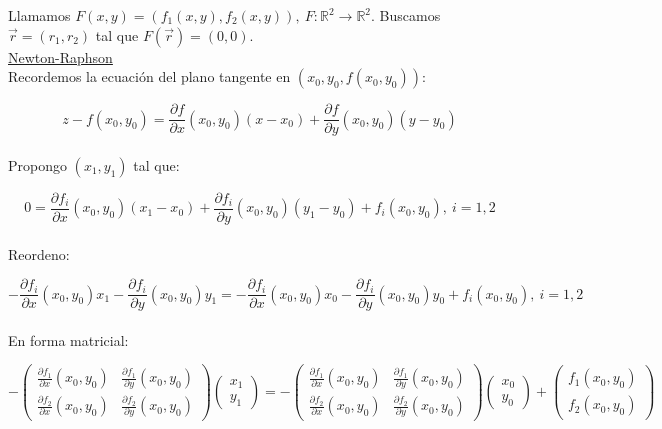Llamamos $F(x, y) = (f_{1}(x, y), f_{2}(x, y)),\ F: \mathbb{R}^{2} \rightarrow \mathbb{R}^{2}$. Buscamos $\Vec{r} = (r_{1}, r_{2})$ tal que $F(\Vec{r}) = (0, 0)$.\\

\underline{Newton-Raphson}\\

Recordemos la ecuaci\'on del plano tangente en $(x_{0}, y_{0}, f(x_{0}, y_{0}))$:

$$z - f(x_{0}, y_{0}) = \frac{\partial f}{\partial x}(x_{0}, y_{0})(x - x_{0}) + \frac{\partial f}{\partial y}(x_{0}, y_{0})(y - y_{0})$$\\

Propongo $(x_{1}, y_{1})$ tal que:

$$ 0 = \frac{\partial f_{i}}{\partial x}(x_{0}, y_{0})(x_{1} - x_{0}) + \frac{\partial f_{i}}{\partial y}(x_{0}, y_{0})(y_{1} - y_{0}) + f_{i}(x_{0}, y_{0}),\ i = 1, 2$$\\

Reordeno:

$$ -\frac{\partial f_{i}}{\partial x}(x_{0}, y_{0})x_{1} - \frac{\partial f_{i}}{\partial y}(x_{0}, y_{0})y_{1} = -\frac{\partial f_{i}}{\partial x}(x_{0}, y_{0})x_{0} - \frac{\partial f_{i}}{\partial y}(x_{0}, y_{0})y_{0} + f_{i}(x_{0}, y_{0}),\ i = 1, 2$$\\

En forma matricial:

$$    -
    \begin{pmatrix}
        \frac{\partial f_{1}}{\partial x}(x_{0}, y_{0}) & \frac{\partial f_{1}}{\partial y}(x_{0}, y_{0})\\
        \frac{\partial f_{2}}{\partial x}(x_{0}, y_{0}) & \frac{\partial f_{2}}{\partial y}(x_{0}, y_{0})
    \end{pmatrix}
    \begin{pmatrix}
        x_{1}\\
        y_{1}
    \end{pmatrix}
    = -
    \begin{pmatrix}
        \frac{\partial f_{1}}{\partial x}(x_{0}, y_{0}) & \frac{\partial f_{1}}{\partial y}(x_{0}, y_{0})\\
        \frac{\partial f_{2}}{\partial x}(x_{0}, y_{0}) & \frac{\partial f_{2}}{\partial y}(x_{0}, y_{0})
    \end{pmatrix}
    \begin{pmatrix}
        x_{0}\\
        y_{0}
    \end{pmatrix}
    +
    \begin{pmatrix}
        f_{1}(x_{0}, y_{0})\\
        f_{2}(x_{0}, y_{0})
    \end{pmatrix}
$$\\

